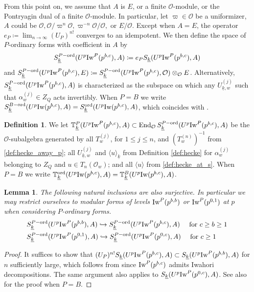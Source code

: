\documentclass[leqno]{amsart}
\newtheorem{lem}[thm]{Lemma}
\theoremstyle{definition}
\newtheorem{defn}[thm]{Definition}
\theoremstyle{remark}
\newcommand{\oo}{\mathcal{O}}
\DeclareMathOperator{\End}{End}
\newcommand{\wt}[1]{\underline{ #1 }}
\newcommand{\Iw}{\textnormal{Iw}} %
\newcommand{\TT}{\mathbb{T}} %
\newcommand{\ord}{\textnormal{ord}} %
\begin{document}
From this point on,
we assume that $A$ is $E$, or a finite $\oo$-module,
or the Pontryagin dual of a finite $\oo$-module.
In particular, let $\varpi\in \oo$ be a uniformizer, $A$ could be 
$\oo, \oo/\varpi^n\oo, \varpi^{-n}\oo/\oo,$ or $E/\oo$.
Except when $A=E$,
the operator $e_P\coloneqq\lim_{n\to \infty}(U_P)^{n!}$
converges to an idempotent.
We then define the space of $P$-ordinary forms 
with coefficient in $A$ by
\[
	S_{\wt{k}}^{P-\ord}(U^p\Iw^P(p^{b,c}),A)\coloneqq
	e_PS_{\wt{k}}(U^p\Iw^P(p^{b,c}),A)
\]
and $S_{\wt{k}}^{P-\ord}(U^p\Iw^P(p^{b,c}),E)\coloneqq 
S_{\wt{k}}^{P-\ord}(U^p\Iw^P(p^{b,c}),\oo)\otimes_{\oo}E$.
Alternatively,
$S_{\wt{k}}^{P-\ord}(U^p\Iw^P(p^{b,c}),A)$
is characterized as the subspace on which 
any  $U_{\wt{k},w}^{(j)}$ such that 
$\alpha_w^{(j)}\in Z_Q$ acts invertibly.
When $P=B$ we write 
$S_{\wt{k}}^{B-\ord}(U^p\Iw(p^{b,c}),A)=
S_{\wt{k}}^{\ord}(U^p\Iw(p^{b,c}),A)$,
which coincides with \cite[Def 2.13]{ger}.

\begin{defn}\label{def:ord_hecke}
	We let $\TT^P_{\wt{k}}(U^p\Iw^P(p^{b,c}),A)\subset 
    \End_{\oo}S_{\wt{k}}^{P-\ord}(U^p\Iw^P(p^{b,c}),A)$
	be the $\oo$-subalgebra
	generated by all
	$T_w^{(j)}$, for $1\leq j\leq n$,
	and $(T_w^{(n)})^{-1}$ from \eqref{def:hecke_away_p};
	all $U_{\wt{k},w}^{(j)}$ and $\langle u\rangle_{\wt{k}}$
    from Definition \ref{def:hecke}
	for $\alpha_w^{(j)}$ belonging to $Z_Q$ and $u\in T_n(\oo_w)$;
    and all $\langle u\rangle$ from \eqref{def:hecke_at_s}.
    When $P=B$
    we write $\TT^{\ord}_{\wt{k}}(U^p\Iw(p^{b,c}),A)=
    \TT^B_{\wt{k}}(U^p\Iw(p^{b,c}),A)$.
\end{defn}

\begin{lem}\label{lem:control}
	The following natural inclusions are also surjective.
    In particular we may restrict ourselves 
    to modular forms of levels $\Iw^P(p^{b,b})$ or $\Iw^P(p^{0,1})$
    at $p$ when considering $P$-ordinary forms.
	\begin{align*}
	&S_{\wt{k}}^{P-\ord}(U^p\Iw^P(p^{b,b}),A)\hookrightarrow	
	S_{\wt{k}}^{P-\ord}(U^p\Iw^P(p^{b,c}),A)\quad 
	\text{ for } c\geq b\geq 1\\
	&S_{\wt{k}}^{P-\ord}(U^p\Iw^P(p^{0,1}),A)\hookrightarrow	
	S_{\wt{k}}^{P-\ord}(U^p\Iw^P(p^{0,c}),A)\quad \text{ for } c\geq 1
	\end{align*}
\end{lem}
\begin{proof}
	It suffices to show that 
	$(U_P)^{n!}S_{\wt{k}}(U^p\Iw^P(p^{b,c}),A)
	\subset S_{\wt{k}}(U^p\Iw^P(p^{b,b}),A)$
	for $n$ sufficiently large, 
	which follows from \cite[Lem 3.3.2]{emeI}
	since $\Iw^P(p^{b,c})$ admits Iwahori decompositions.
	The same argument also applies to 
	$S_{\wt{k}}(U^p\Iw^P(p^{0,c}),A)$.
	See also \cite[Lem 2.19]{ger} for the proof when $P=B$.
\end{proof}
\end{document}

